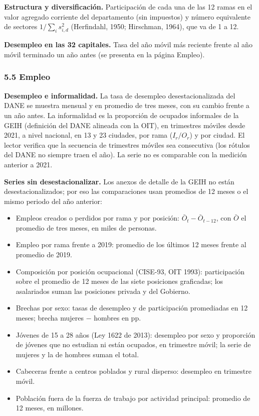 \textbf{Estructura y diversificación.} Participación de cada una de las
12 ramas en el valor agregado corriente del departamento (sin impuestos)
y número equivalente de sectores \(1/\sum_i s_{i,d}^2\) (Herfindahl,
1950; Hirschman, 1964), que va de 1 a 12.

\textbf{Desempleo en las 32 capitales.} Tasa del año móvil más reciente
frente al año móvil terminado un año antes (se presenta en la página
Empleo).

\hypertarget{empleo}{%
\subsubsection{5.5 Empleo}\label{empleo}}

\textbf{Desempleo e informalidad.} La tasa de desempleo
desestacionalizada del DANE se muestra mensual y en promedio de tres
meses, con su cambio frente a un año antes. La informalidad es la
proporción de ocupados informales de la GEIH (definición del DANE
alineada con la OIT), en trimestres móviles desde 2021, a nivel
nacional, en 13 y 23 ciudades, por rama (\(I_r/O_r\)) y por ciudad. El
lector verifica que la secuencia de trimestres móviles sea consecutiva
(los rótulos del DANE no siempre traen el año). La serie no es
comparable con la medición anterior a 2021.

\textbf{Series sin desestacionalizar.} Los anexos de detalle de la GEIH
no están desestacionalizados; por eso las comparaciones usan promedios
de 12 meses o el mismo periodo del año anterior:

\begin{itemize}
\tightlist
\item
  Empleos creados o perdidos por rama y por posición:
  \(\bar O_t-\bar O_{t-12}\), con \(\bar O\) el promedio de tres meses,
  en miles de personas.
\item
  Empleo por rama frente a 2019: promedio de los últimos 12 meses frente
  al promedio de 2019.
\item
  Composición por posición ocupacional (CISE-93, OIT 1993):
  participación sobre el promedio de 12 meses de las siete posiciones
  graficadas; los asalariados suman las posiciones privada y del
  Gobierno.
\item
  Brechas por sexo: tasas de desempleo y de participación promediadas en
  12 meses; brecha mujeres − hombres en pp.
\item
  Jóvenes de 15 a 28 años (Ley 1622 de 2013): desempleo por sexo y
  proporción de jóvenes que no estudian ni están ocupados, en trimestre
  móvil; la serie de mujeres y la de hombres suman el total.
\item
  Cabeceras frente a centros poblados y rural disperso: desempleo en
  trimestre móvil.
\item
  Población fuera de la fuerza de trabajo por actividad principal:
  promedio de 12 meses, en millones.
\end{itemize}

